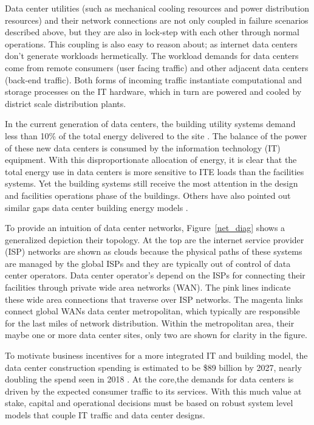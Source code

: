     Data center utilities (such as mechanical cooling resources and power distribution resources) and their network connections are not only coupled in failure scenarios described above, but they are also in lock-step with each other through normal operations. This coupling is also easy to reason about; as internet data centers don’t generate workloads hermetically. The workload demands for data centers come from remote consumers (user facing traffic) and other adjacent data centers (back-end traffic). Both forms of incoming traffic instantiate computational and storage processes on the IT hardware, which in turn are powered and cooled by district scale distribution plants.
    
    In the current generation of data centers, the building utility systems demand less than 10\% of the total energy delivered to the site \cite{Shehabi16}. The balance of the power of these new data centers is consumed by the information technology (IT) equipment. With this disproportionate allocation of energy, it is clear that the total energy use in data centers is more sensitive to ITE loads than the facilities systems. Yet the building systems still receive the most attention in the design and facilities operations phase of the buildings. Others have also pointed out similar gaps data center building energy models \cite{Beatty15}. 
    
    To provide an intuition of data center networks, Figure~\ref{net_diag} shows a generalized depiction their topology. At the top are the internet service provider (ISP) networks are shown as clouds because the physical paths of these systems are managed by the global ISPs and they are typically out of control of data center operators. Data center operator’s depend on the ISPs for connecting their facilities through private wide area networks (WAN). The pink lines indicate these wide area connections that traverse over ISP networks. The magenta links connect global WANs data center metropolitan, which typically are responsible for the last miles of network distribution. Within the metropolitan area, their maybe one or more data center sites, only two are shown for clarity in the figure. 
    
    
    
    To motivate business incentives  for  a  more  integrated  IT  and  building model, the  data  center construction spending is estimated to be \$89 billion by 2027, nearly doubling the spend seen in 2018 \cite{dcmarket19}. At the core,the demands for data centers is driven by the expected consumer traffic to its services. With this much value at stake, capital and operational decisions must be based on robust system level models that couple IT traffic and data center designs.
    
